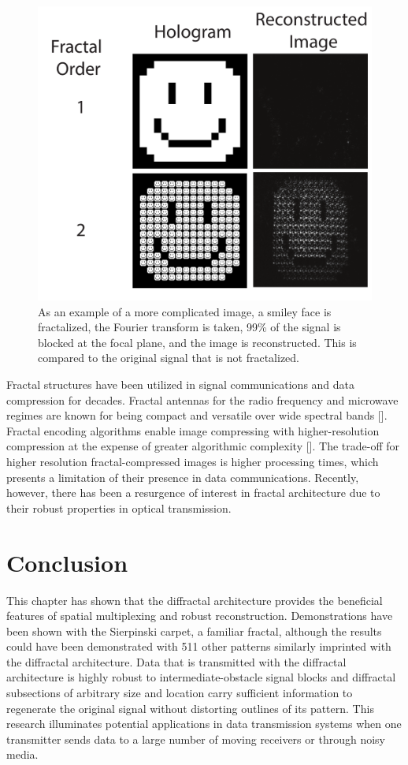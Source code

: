 \begin{figure}[h!]
\includegraphics[width=\textwidth]{imgRecon.pdf}
\caption[]{As an example of a more complicated image, a smiley face is fractalized, the Fourier transform is taken, 99\% of the signal is blocked at the focal plane, and the image is reconstructed. This is compared to the original signal that is not fractalized.}
\label{face}
\end{figure}

Fractal structures have been utilized in signal communications and data compression for decades. Fractal antennas for the radio frequency and microwave regimes are known for being compact and versatile over wide spectral bands [\cite{Radonic,Puente-Baliarda}]. Fractal encoding algorithms enable image compressing with higher-resolution compression at the expense of greater algorithmic complexity [\cite{Jacquin}]. The trade-off for higher resolution fractal-compressed images is higher processing times, which presents a limitation of their presence in data communications. Recently, however, there has been a resurgence of interest in fractal architecture due to their robust properties in optical transmission.

\section{Conclusion}
This chapter has shown that the diffractal architecture provides the beneficial features of spatial multiplexing and robust reconstruction. Demonstrations have been shown with the Sierpinski carpet, a familiar fractal, although the results could have been demonstrated with 511 other patterns similarly imprinted with the diffractal architecture. Data that is transmitted with the diffractal architecture is highly robust to intermediate-obstacle signal blocks and diffractal subsections of arbitrary size and location carry sufficient information to regenerate the original signal without distorting outlines of its pattern.  This research illuminates potential applications in data transmission systems when one transmitter sends data to a large number of moving receivers or through noisy media.

